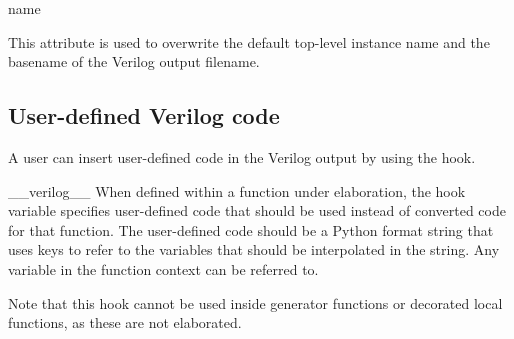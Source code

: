 \begin{memberdesc}[toVerilog]{name}

This attribute is used to overwrite the default top-level instance
name and the basename of the Verilog output filename.

\end{memberdesc}

\subsection{User-defined Verilog code \label{ref-conv-user}}

A user can insert user-defined code in the Verilog output
by using the  hook.

\begin{datadesc}{__verilog__}
When defined within a function under elaboration, the
 hook variable specifies user-defined code that
should be used instead of converted code for that function.  The
user-defined code should be a Python format string that uses keys to
refer to the variables that should be interpolated in the string. Any
variable in the function context can be referred to.

Note that this hook cannot be used inside generator functions or
decorated local functions, as these are not elaborated.
\end{datadesc}
